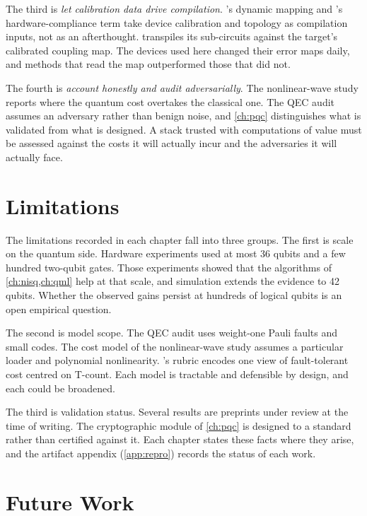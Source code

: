 The third is \emph{let calibration data drive compilation}. \deal's dynamic mapping and \rubriq's hardware-compliance term take device calibration and topology as compilation inputs, not as an afterthought. \shardq{} transpiles its sub-circuits against the target's calibrated coupling map. The devices used here changed their error maps daily, and methods that read the map outperformed those that did not.

The fourth is \emph{account honestly and audit adversarially}. The nonlinear-wave study reports where the quantum cost overtakes the classical one. The QEC audit assumes an adversary rather than benign noise, and \cref{ch:pqc} distinguishes what is validated from what is designed. A stack trusted with computations of value must be assessed against the costs it will actually incur and the adversaries it will actually face.

\section{Limitations}\label{sec:conclusion:limitations}

The limitations recorded in each chapter fall into three groups. The first is scale on the quantum side. Hardware experiments used at most 36 qubits and a few hundred two-qubit gates. Those experiments showed that the algorithms of \cref{ch:nisq,ch:qml} help at that scale, and simulation extends the evidence to 42 qubits. Whether the observed gains persist at hundreds of logical qubits is an open empirical question.

The second is model scope. The QEC audit uses weight-one Pauli faults and small codes. The cost model of the nonlinear-wave study assumes a particular loader and polynomial nonlinearity. \rubriq's rubric encodes one view of fault-tolerant cost centred on T-count. Each model is tractable and defensible by design, and each could be broadened.

The third is validation status. Several results are preprints under review at the time of writing. The cryptographic module of \cref{ch:pqc} is designed to a standard rather than certified against it. Each chapter states these facts where they arise, and the artifact appendix (\cref{app:repro}) records the status of each work.

\section{Future Work}\label{sec:conclusion:future}

